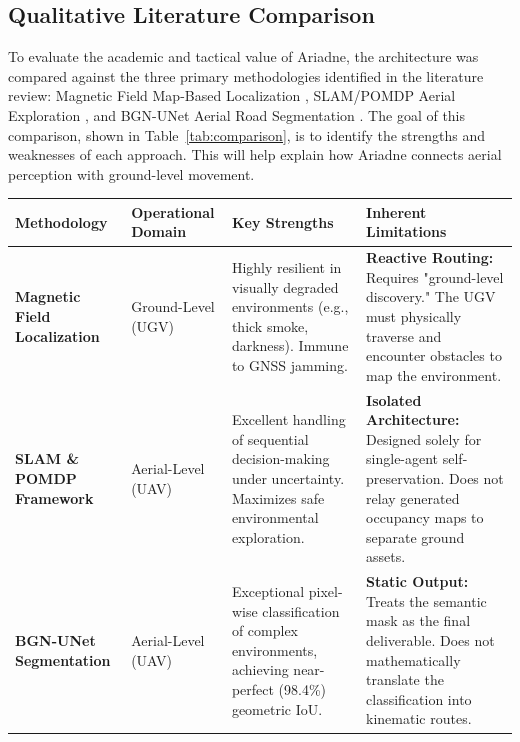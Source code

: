 \documentclass[12pt, a4paper]{article}
\begin{document}
\subsection{Qualitative Literature Comparison}

\quad To evaluate the academic and tactical value of Ariadne, the architecture was compared against the three primary methodologies identified in the literature review: Magnetic Field Map-Based Localization \cite{11219502}, SLAM/POMDP Aerial Exploration \cite{8741612}, and BGN-UNet Aerial Road Segmentation \cite{Doghmane_Boukari_2024}. The goal of this comparison, shown in Table~\ref{tab:comparison}, is to identify the strengths and weaknesses of each approach. This will help explain how Ariadne connects aerial perception with ground-level movement.

\begin{table}[t]
    \centering
    \renewcommand{\arraystretch}{1.5}
    \begin{tabular}{|p{}|p{}|p{}|p{}|}
        \hline
        \textbf{Methodology} & \textbf{Operational Domain} & \textbf{Key Strengths} & \textbf{Inherent Limitations} \\ \hline
        
        \textbf{Magnetic Field \newline Localization} \cite{11219502} & Ground-Level (UGV) & Highly resilient in visually degraded environments (e.g., thick smoke, darkness). Immune to GNSS jamming. & \textbf{Reactive Routing:} Requires "ground-level discovery." The UGV must physically traverse and encounter obstacles to map the environment. \\ \hline
        
        \textbf{SLAM \& POMDP Framework} \cite{8741612} & Aerial-Level (UAV) & Excellent handling of sequential decision-making under uncertainty. Maximizes safe environmental exploration. & \textbf{Isolated Architecture:} Designed solely for single-agent self-preservation. Does not relay generated occupancy maps to separate ground assets. \\ \hline
        
        \textbf{BGN-UNet \newline Segmentation} \cite{Doghmane_Boukari_2024} & Aerial-Level (UAV) & Exceptional pixel-wise classification of complex environments, achieving near-perfect (98.4\%) geometric IoU. & \textbf{Static Output:} Treats the semantic mask as the final deliverable. Does not mathematically translate the classification into kinematic routes. \\ \hline
        

\end{tabular}
\end{table}
\end{document}
